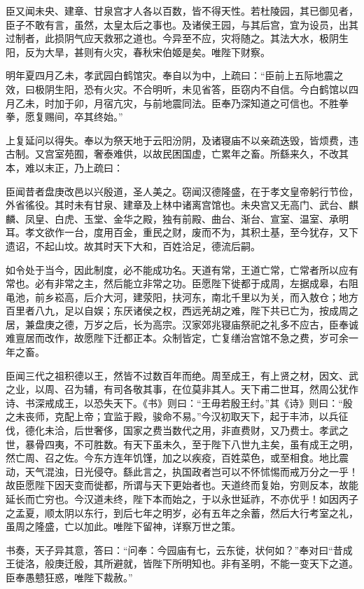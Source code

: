 \documentclass[]{article}
\begin{document}
臣又闻未央、建章、甘泉宫才人各以百数，皆不得天性。若杜陵园，其已御见者，臣子不敢有言，虽然，太皇太后之事也。及诸侯王园，与其后宫，宜为设员，出其过制者，此损阴气应天救邪之道也。今异至不应，灾将随之。其法大水，极阴生阳，反为大旱，甚则有火灾，春秋宋伯姬是矣。唯陛下财察。

明年夏四月乙未，孝武园白鹤馆灾。奉自以为中，上疏曰：``臣前上五际地震之效，曰极阴生阳，恐有火灾。不合明听，未见省答，臣窃内不自信。今白鹤馆以四月乙未，时加于卯，月宿亢灾，与前地震同法。臣奉乃深知道之可信也。不胜拳拳，愿复赐间，卒其终始。''

上复延问以得失。奉以为祭天地于云阳汾阴，及诸寝庙不以亲疏迭毁，皆烦费，违古制。又宫室苑囿，奢泰难供，以故民困国虚，亡累年之畜。所繇来久，不改其本，难以末正，乃上疏曰：

臣闻昔者盘庚改邑以兴殷道，圣人美之。窃闻汉德隆盛，在于孝文皇帝躬行节俭，外省徭役。其时未有甘泉、建章及上林中诸离宫馆也。未央宫又无高门、武台、麒麟、凤皇、白虎、玉堂、金华之殿，独有前殿、曲台、渐台、宣室、温室、承明耳。孝文欲作一台，度用百金，重民之财，废而不为，其积土基，至今犹存，又下遗诏，不起山坟。故其时天下大和，百姓洽足，德流后嗣。

如令处于当今，因此制度，必不能成功名。天道有常，王道亡常，亡常者所以应有常也。必有非常之主，然后能立非常之功。臣愿陛下徙都于成周，左据成皋，右阻黾池，前乡崧高，后介大河，建荥阳，扶河东，南北千里以为关，而入敖仓；地方百里者八九，足以自娱；东厌诸侯之权，西远羌胡之难，陛下共已亡为，按成周之居，兼盘庚之德，万岁之后，长为高宗。汉家郊兆寝庙祭祀之礼多不应古，臣奉诚难亶居而改作，故愿陛下迁都正本。众制皆定，亡复缮治宫馆不急之费，岁可余一年之畜。

臣闻三代之祖积德以王，然皆不过数百年而绝。周至成王，有上贤之材，因文、武之业，以周、召为辅，有司各敬其事，在位莫非其人。天下甫二世耳，然周公犹作诗、书深戒成王，以恐失天下。《书》则曰：``王毋若殷王纣。''其《诗》则曰：``殷之未丧师，克配上帝；宜监于殿，骏命不易。''今汉初取天下，起于丰沛，以兵征伐，德化未洽，后世奢侈，国家之费当数代之用，非直费财，又乃费士。孝武之世，暴骨四夷，不可胜数。有天下虽未久，至于陛下八世九主矣，虽有成王之明，然亡周、召之佐。今东方连年饥馑，加之以疾疫，百姓菜色，或至相食。地比震动，天气混浊，日光侵夺。繇此言之，执国政者岂可以不怀怵惕而戒万分之一乎！故臣愿陛下因天变而徙都，所谓与天下更始者也。天道终而复始，穷则反本，故能延长而亡穷也。今汉道未终，陛下本而始之，于以永世延祚，不亦优乎！如因丙子之孟夏，顺太阴以东行，到后七年之明岁，必有五年之余蓄，然后大行考室之礼，虽周之隆盛，亡以加此。唯陛下留神，详察万世之策。

书奏，天子异其意，答曰：``问奉：今园庙有七，云东徙，状何如？''奉对曰``昔成王徙洛，般庚迁殷，其所避就，皆陛下所明知也。非有圣明，不能一变天下之道。臣奉愚戆狂惑，唯陛下裁赦。''
\end{document}
